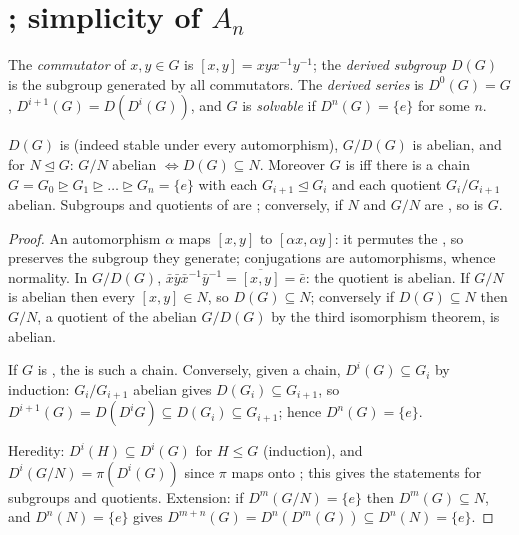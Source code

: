 \section{; simplicity of \texorpdfstring{$A_n$}{An}}

\begin{definition}\label{def:b3:groups:derived}
The \emph{commutator} of $x, y \in G$ is $[x,y]
= xyx^{-1}y^{-1}$; the \emph{derived subgroup} $D(G)$ is the subgroup generated by all commutators. The
\emph{derived series} is $D^0(G) = G$, $D^{i+1}(G) = D(D^i(G))$,
and $G$ is \emph{solvable} if $D^n(G) =
\{e\}$ for some $n$.
\end{definition}

\begin{proposition}\label{prop:b3:groups:derived}
$D(G)$ is  (indeed stable under every automorphism), $G/D(G)$
is abelian, and for $N \trianglelefteq G$: $G/N$ abelian $\iff
D(G) \subseteq N$. Moreover $G$ is  iff there is a chain
$G = G_0 \trianglerighteq G_1 \trianglerighteq \dots
\trianglerighteq G_n = \{e\}$ with each $G_{i+1} \trianglelefteq
G_i$ and each quotient $G_i/G_{i+1}$ abelian. Subgroups and
quotients of  are ; conversely, if $N$ and
$G/N$ are , so is $G$.
\end{proposition}

\begin{proof}
An automorphism $\alpha$ maps $[x,y]$ to $[\alpha x, \alpha y]$: it
permutes the , so preserves the subgroup they generate;
conjugations are automorphisms, whence normality. In $G/D(G)$,
$\bar x\bar y \bar x^{-1}\bar y^{-1} = \overline{[x,y]} = \bar e$:
the quotient is abelian. If $G/N$ is abelian then every $[x,y] \in
N$, so $D(G) \subseteq N$; conversely if $D(G) \subseteq N$ then
$G/N$, a quotient of the abelian $G/D(G)$ by the third isomorphism
theorem, is abelian.

If $G$ is , the  is such a chain. Conversely,
given a chain, $D^i(G) \subseteq G_i$ by induction: $G_i/G_{i+1}$
abelian gives $D(G_i) \subseteq G_{i+1}$, so $D^{i+1}(G) = D(D^i G)
\subseteq D(G_i) \subseteq G_{i+1}$; hence $D^n(G) = \{e\}$.

Heredity: $D^i(H) \subseteq D^i(G)$ for $H \leq G$ (induction),
and $D^i(G/N) = \pi(D^i(G))$ since $\pi$ maps  onto
; this gives the statements for subgroups and quotients.
Extension: if $D^m(G/N) = \{e\}$ then $D^m(G) \subseteq N$, and
$D^n(N) = \{e\}$ gives $D^{m+n}(G) = D^n(D^m(G)) \subseteq D^n(N)
= \{e\}$.
\end{proof}

